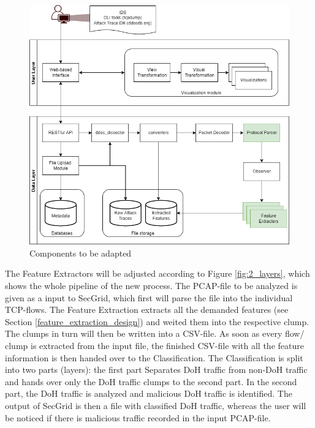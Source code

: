 \begin{figure} [h]
\includegraphics[scale=0.6]{images/changed_architecture.png}
\centering
\caption{Components to be adapted}
\label{fig:changed_arch}
\end{figure}

The Feature Extractors will be adjusted according to Figure \ref{fig:2_layers}, which shows the whole pipeline of the new process. The PCAP-file to be analyzed is given as a input to SecGrid, which first will parse the file into the individual TCP-flows. The Feature Extraction extracts all the demanded features (see Section \ref{feature_extraction_design}) and weited them into the respective clump. The clumps in turn will then be written into a CSV-file. As soon as every flow/ clump is extracted from the input file, the finished CSV-file with all the feature information is then handed over to the Classification. The Classification is split into two parts (layers): the first part Separates DoH traffic from non-DoH traffic and hands over only the DoH traffic clumps to the second part. In the second part, the DoH traffic is analyzed and malicious DoH traffic is identified. The output of SecGrid is then a file with classified DoH traffic, whereas the user will be noticed if there is malicious traffic recorded in the input PCAP-file.

